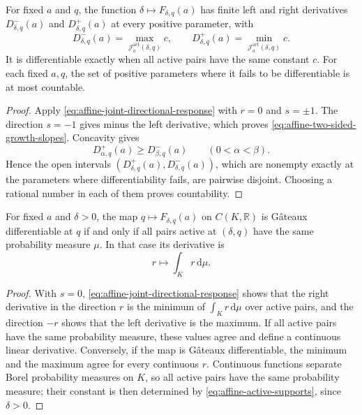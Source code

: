 \begin{corollary}\label{cor:affine-two-sided-growth-slopes}
For fixed $a$ and $q$, the function $\delta\mapsto F_{\delta,q}(a)$ has finite left and right derivatives $D^-_{\delta,q}(a)$ and $D^+_{\delta,q}(a)$ at every positive parameter, with
\begin{equation}\label{eq:affine-two-sided-growth-slopes}
 D^-_{\delta,q}(a)=\max_{\mathcal J^{\mathrm{act}}_a(\delta,q)}c,
 \qquad
 D^+_{\delta,q}(a)=\min_{\mathcal J^{\mathrm{act}}_a(\delta,q)}c.
\end{equation}
It is differentiable exactly when all active pairs have the same constant $c$. For each fixed $a,q$, the set of positive parameters where it fails to be differentiable is at most countable.
\end{corollary}
\begin{proof}
Apply \eqref{eq:affine-joint-directional-response} with $r=0$ and $s=\pm1$. The direction $s=-1$ gives minus the left derivative, which proves \eqref{eq:affine-two-sided-growth-slopes}. Concavity gives
\[
 D^+_{\alpha,q}(a)\geq D^-_{\beta,q}(a)
 \qquad(0<\alpha<\beta).
\]
Hence the open intervals $(D^+_{\delta,q}(a),D^-_{\delta,q}(a))$, which are nonempty exactly at the parameters where differentiability fails, are pairwise disjoint. Choosing a rational number in each of them proves countability.
\end{proof}

\begin{corollary}\label{cor:affine-weight-differentiability}
For fixed $a$ and $\delta>0$, the map $q\mapsto F_{\delta,q}(a)$ on $C(K,\mathbb R)$ is G\^ateaux differentiable at $q$ if and only if all pairs active at $(\delta,q)$ have the same probability measure $\mu$. In that case its derivative is
\[
 r\longmapsto\int_Kr\,\mathrm{d}\mu.
\]
\end{corollary}
\begin{proof}
With $s=0$, \eqref{eq:affine-joint-directional-response} shows that the right derivative in the direction $r$ is the minimum of $\int_Kr\,\mathrm{d}\mu$ over active pairs, and the direction $-r$ shows that the left derivative is the maximum. If all active pairs have the same probability measure, these values agree and define a continuous linear derivative. Conversely, if the map is G\^ateaux differentiable, the minimum and the maximum agree for every continuous $r$. Continuous functions separate Borel probability measures on $K$, so all active pairs have the same probability measure; their constant is then determined by \eqref{eq:affine-active-supports}, since $\delta>0$.
\end{proof}


